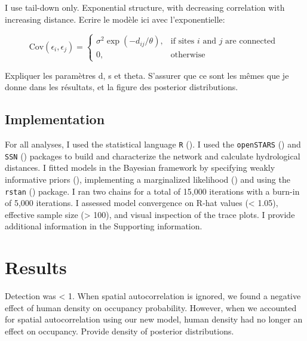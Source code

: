 \documentclass[
  11pt,
  a4paper,
]{article}
\begin{document}
I use tail-down only. Exponential structure, with decreasing correlation with increasing distance. Ecrire le modèle ici avec l'exponentielle:

\[
    \text{Cov}(\epsilon_i,\epsilon_j)= 
\begin{cases}
    \displaystyle{\sigma^2\exp(-d_{ij}/\theta)},& \text{if sites } i \text{ and } j \text{ are connected }\\
    0,              & \text{otherwise}
\end{cases}
\]

Expliquer les paramètres d, s et theta. S'assurer que ce sont les mêmes que je donne dans les résultats, et la figure des posterior distributions.

\subsection{Implementation}\label{implementation}

For all analyses, I used the statistical language \texttt{R} (). I used the \texttt{openSTARS} () and \texttt{SSN} () packages to build and characterize the network and calculate hydrological distances. I fitted models in the Bayesian framework by specifying weakly informative priors (), implementing a marginalized likelihood () and using the \texttt{rstan} () package. I ran two chains for a total of 15,000 iterations with a burn-in of 5,000 iterations. I assessed model convergence on R-hat values (\textless{} 1.05), effective sample size (\textgreater{} 100), and visual inspection of the trace plots. I provide additional information in the Supporting information.

\section{Results}\label{results}

Detection was \textless{} 1. When spatial autocorrelation is ignored, we found a negative effect of human density on occupancy probability. However, when we accounted for spatial autocorrelation using our new model, human density had no longer an effect on occupancy. Provide density of posterior distributions.
\end{document}
